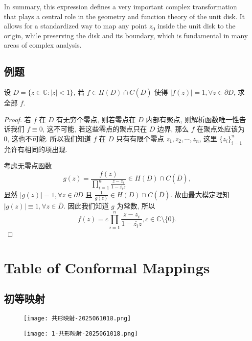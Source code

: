 In summary, this expression defines a very important complex transformation that plays a central role in the geometry and function theory of the unit disk. It allows for a standardized way to map any point $z_0$ inside the unit disk to the origin, while preserving the disk and its boundary, which is fundamental in many areas of complex analysis.

\subsection{例题}

\begin{exercise}
设 $D = \{z \in \mathbb{C} : |z| < 1\}$, 若 $f \in H(D) \cap C(\overline{D})$ 使得 $|f(z)| = 1, \forall z \in \partial D$, 求全部 $f$.
\end{exercise}
\begin{proof}
若 $f$ 在 $D$ 有无穷个零点, 则若零点在 $D$ 内部有聚点, 则解析函数唯一性告诉我们 $f \equiv 0$, 这不可能, 若这些零点的聚点只在 $D$ 边界, 那么 $f$ 在聚点处应该为 0, 这也不可能. 所以我们知道 $f$ 在 $D$ 只有有限个零点 $z_1, z_2, \cdots, z_n$, 这里 $\{z_i\}_{i=1}^n$ 允许有相同的项出现.

考虑无零点函数
\[
g(z) = \frac{f(z)}{\prod_{i=1}^n \frac{z - z_i}{1 - \overline{z_i}z}} \in H(D) \cap C(\overline{D}),
\]
显然 $|g(z)| = 1, \forall z \in \partial D$ 且 $\frac{1}{g(z)} \in H(D) \cap C(\overline{D})$. 故由最大模定理知 $|g(z)| \equiv 1, \forall z \in \overline{D}$. 因此我们知道 $g$ 为常数, 所以
\[
f(z) = c \prod_{i=1}^n \frac{z - z_i}{1 - \overline{z_i}z}, c \in \mathbb{C} \setminus \{0\}.
\]
\end{proof}

\section{Table of Conformal Mappings}

\subsection{初等映射}

\begin{figure}[H]
\centering
\texttt{[image: 共形映射-2025061018.png]}
\label{}
\end{figure}
\begin{figure}[H]
\centering
\texttt{[image: 1-共形映射-2025061018.png]}
\label{}
\end{figure}

